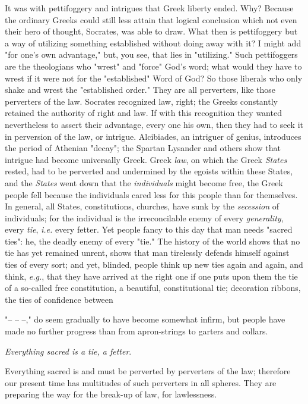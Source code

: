 It was with pettifoggery and intrigues that Greek liberty ended. Why? Because 
the ordinary Greeks could still less attain that logical conclusion which not 
even their hero of thought, Socrates, was able to draw. What then is 
pettifoggery but a way of utilizing something established without doing away 
with it? I might add "{}for one's own advantage,"{} but, you see, that lies in 
"{}utilizing."{} Such pettifoggers are the theologians who "{}wrest"{} and 
"{}force"{} God's word; what would they have to wrest if it were not for the 
"{}established"{} Word of God? So those liberals who only shake and wrest the 
"{}established order."{} They are all perverters, like those perverters of the 
law. Socrates recognized law, right; the Greeks constantly retained the 
authority of right and law. If with this recognition they wanted nevertheless 
to assert their advantage, every one his own, then they had to seek it in 
perversion of the law, or intrigue. Alcibiades, an intriguer of genius, 
introduces the period of Athenian "{}decay"{}; the Spartan Lysander and others 
show that intrigue had become universally Greek. Greek \textit{law}, on which 
the Greek \textit{States} rested, had to be perverted and undermined by the 
egoists within these States, and the \textit{States} went down that the 
\textit{individuals} might become free, the Greek people fell because the 
individuals cared less for this people than for themselves. In general, all 
States, constitutions, churches, have sunk by the \textit{secession} of 
individuals; for the individual is the irreconcilable enemy of every 
\textit{generality}, every \textit{tie}, \textit{i.e.} every fetter. Yet 
people fancy to this day that man needs "{}sacred ties"{}: he, the deadly 
enemy of every "{}tie."{} The history of the world shows that no tie has yet 
remained unrent, shows that man tirelessly defends himself against ties of 
every sort; and yet, blinded, people think up new ties again and again, and 
think, \textit{e.g.}, that they have arrived at the right one if one puts upon 
them the tie of a so-called free constitution, a beautiful, constitutional 
tie; decoration ribbons, the ties of confidence between

"{}-- -- --,"{} do seem gradually to have become somewhat infirm, but people 
have made no further progress than from apron-strings to garters and collars.

\textit{Everything sacred is a tie, a fetter}.

Everything sacred is and must be perverted by perverters of the law; therefore 
our present time has multitudes of such perverters in all spheres. They are 
preparing the way for the break-up of law, for lawlessness.

